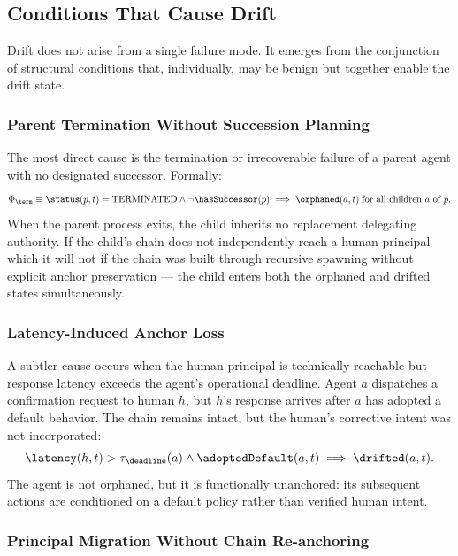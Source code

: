 \subsection{Conditions That Cause Drift}

Drift does not arise from a single failure mode. It emerges from the conjunction of structural conditions that, individually, may be benign but together enable the drift state.

\subsubsection{Parent Termination Without Succession Planning}

The most direct cause is the termination or irrecoverable failure of a parent agent with no designated successor. Formally:
\begin{equation}
\Phi_{\term} \equiv \status(p, t) = \text{TERMINATED} \land \neg \hasSuccessor(p)
\implies \orphaned(a, t) \;\text{for all children } a \text{ of } p.
\end{equation}
When the parent process exits, the child inherits no replacement delegating authority. If the child's chain does not independently reach a human principal — which it will not if the chain was built through recursive spawning without explicit anchor preservation — the child enters both the orphaned and drifted states simultaneously.

\subsubsection{Latency-Induced Anchor Loss}

A subtler cause occurs when the human principal is technically reachable but response latency exceeds the agent's operational deadline. Agent $a$ dispatches a confirmation request to human $h$, but $h$'s response arrives after $a$ has adopted a default behavior. The chain remains intact, but the human's corrective intent was not incorporated:
\begin{equation}
\latency(h, t) > \tau_{\deadline}(a) \land \adoptedDefault(a, t) \implies \drifted(a, t).
\end{equation}
The agent is not orphaned, but it is functionally unanchored: its subsequent actions are conditioned on a default policy rather than verified human intent.

\subsubsection{Principal Migration Without Chain Re-anchoring}

